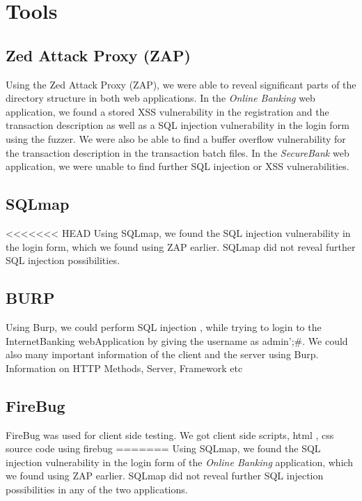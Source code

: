 \chapter{Tools}\label{chapter:tools}

\section{Zed Attack Proxy (ZAP)}
Using the Zed Attack Proxy (ZAP), we were able to reveal significant parts of the directory structure in both web applications. In the \textit{Online Banking} web application, we found a stored XSS vulnerability in the registration and the transaction description as well as a SQL injection vulnerability in the login form using the fuzzer. We were also be able to find a buffer overflow vulnerability for the transaction description in the transaction batch files. In the \textit{SecureBank} web application, we were unable to find further SQL injection or XSS vulnerabilities.

\section{SQLmap}
<<<<<<< HEAD
Using SQLmap, we found the SQL injection vulnerability in the login form, which we found using ZAP earlier. SQLmap did not reveal further SQL injection possibilities.

\section{BURP}
Using Burp, we could perform SQL injection , while trying to login to the InternetBanking webApplication by giving the username as admin';#. We could also many important information of the client and the server using Burp. Information on HTTP Methods, Server, Framework etc

\section{FireBug}
FireBug was used for client side testing. We got client side scripts, html , css source code using firebug
=======
Using SQLmap, we found the SQL injection vulnerability in the login form of the \textit{Online Banking} application, which we found using ZAP earlier. SQLmap did not reveal further SQL injection possibilities in any of the two applications.

